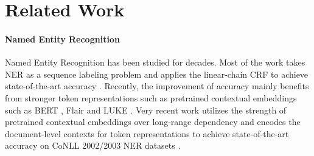 \documentclass[11pt,a4paper]{article}
\begin{document}
\section{Related Work}
\paragraph{Named Entity Recognition}
Named Entity Recognition \citep{Sundheim1995NamedET} has been studied for decades. Most of the work takes NER as a sequence labeling problem and applies the linear-chain CRF \citep{10.5555/645530.655813} to achieve state-of-the-art accuracy \citep{ma-hovy-2016-end,lample-etal-2016-neural,akbik-etal-2018-contextual,akbik-etal-2019-pooled,wang-etal-2020-more}. 
Recently, the improvement of accuracy mainly benefits from stronger token representations such as pretrained contextual embeddings such as BERT \citep{devlin-etal-2019-bert}, Flair \citep{akbik-etal-2018-contextual} and LUKE \citep{yamada-etal-2020-luke}. Very recent work \citep{yu-etal-2020-named,yamada-etal-2020-luke} utilizes the strength of pretrained contextual embeddings over long-range dependency and encodes the document-level contexts for token representations to achieve state-of-the-art accuracy on CoNLL 2002/2003 NER datasets \citep{tjong-kim-sang-2002-introduction,tjong-kim-sang-de-meulder-2003-introduction}. 
\end{document}

